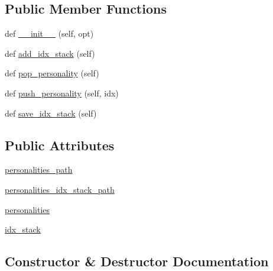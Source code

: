 \subsection*{Public Member Functions}
\begin{DoxyCompactItemize}
\item 
def \hyperlink{classimage__chat__collection_1_1worlds_1_1PersonalityGenerator_aea4fe82298d9fea4e7b20b3380a47c99}{\+\_\+\+\_\+init\+\_\+\+\_\+} (self, opt)
\item 
def \hyperlink{classimage__chat__collection_1_1worlds_1_1PersonalityGenerator_a53113dc205f282b68fb601bb4f1b094e}{add\+\_\+idx\+\_\+stack} (self)
\item 
def \hyperlink{classimage__chat__collection_1_1worlds_1_1PersonalityGenerator_ad35601df7a905c1e043c6fb1117db74e}{pop\+\_\+personality} (self)
\item 
def \hyperlink{classimage__chat__collection_1_1worlds_1_1PersonalityGenerator_afbcf297c74564898b5c96d29c017c7b1}{push\+\_\+personality} (self, idx)
\item 
def \hyperlink{classimage__chat__collection_1_1worlds_1_1PersonalityGenerator_a19645254b8da82832d6bcb0825119c65}{save\+\_\+idx\+\_\+stack} (self)
\end{DoxyCompactItemize}
\subsection*{Public Attributes}
\begin{DoxyCompactItemize}
\item 
\hyperlink{classimage__chat__collection_1_1worlds_1_1PersonalityGenerator_a1d40759bb3feb63f32181b1b623437d2}{personalities\+\_\+path}
\item 
\hyperlink{classimage__chat__collection_1_1worlds_1_1PersonalityGenerator_a7d2134cba68716b4483d31741497c85e}{personalities\+\_\+idx\+\_\+stack\+\_\+path}
\item 
\hyperlink{classimage__chat__collection_1_1worlds_1_1PersonalityGenerator_ad34d454740fa68cf23f3d35121fc92c6}{personalities}
\item 
\hyperlink{classimage__chat__collection_1_1worlds_1_1PersonalityGenerator_acbfcdffd779cc5be94fb47154c770c8a}{idx\+\_\+stack}
\end{DoxyCompactItemize}


\subsection{Constructor \& Destructor Documentation}
\mbox{\label{classimage__chat__collection_1_1worlds_1_1PersonalityGenerator_aea4fe82298d9fea4e7b20b3380a47c99}} 
